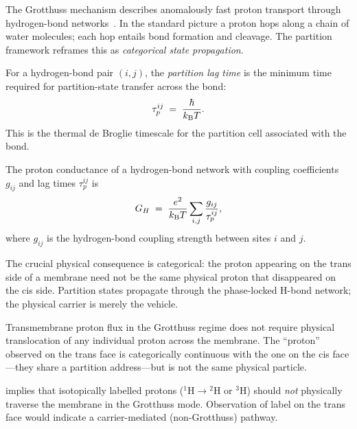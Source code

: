 The Grotthuss mechanism describes anomalously fast proton transport through
hydrogen-bond networks~\citep{Agmon1995}.  In the standard picture a proton hops along a chain of
water molecules; each hop entails bond formation and cleavage.  The partition
framework reframes this as \emph{categorical state propagation}.

\begin{definition}
\label{def:partition-lag}
For a hydrogen-bond pair $(i,j)$, the \emph{partition lag time} is the minimum
time required for partition-state transfer across the bond:
\[
    \tau_p^{ij} \;=\; \frac{\hbar}{k_{\mathrm{B}} T}.
\]
This is the thermal de Broglie timescale for the partition cell associated with
the bond.
\end{definition}

\begin{theorem}
\label{thm:proton-cond}
The proton conductance of a hydrogen-bond network with coupling coefficients
$g_{ij}$ and lag times $\tau_p^{ij}$ is
\begin{equation}
    G_H
    \;=\;
    \frac{e^2}{k_{\mathrm{B}} T}
    \sum_{i,j}\frac{g_{ij}}{\tau_p^{ij}},
    \label{eq:proton-cond}
\end{equation}
where $g_{ij}$ is the hydrogen-bond coupling strength between sites $i$ and $j$.
\end{theorem}

The crucial physical consequence is categorical: the proton appearing on the
trans side of a membrane need not be the same physical proton that disappeared
on the cis side.  Partition states propagate through the phase-locked H-bond
network; the physical carrier is merely the vehicle.

\begin{proposition}
\label{prop:proton-categorical}
Transmembrane proton flux in the Grotthuss regime does not require physical
translocation of any individual proton across the membrane.  The ``proton''
observed on the trans face is categorically continuous with the one on the cis
face---they share a partition address---but is not the same physical particle.
\end{proposition}

\begin{remark}
 implies that isotopically labelled protons
(${}^1\mathrm{H} \to {}^2\mathrm{H}$ or ${}^3\mathrm{H}$) should \emph{not}
physically traverse the membrane in the Grotthuss mode.  Observation of label on
the trans face would indicate a carrier-mediated (non-Grotthuss) pathway.
\end{remark}

